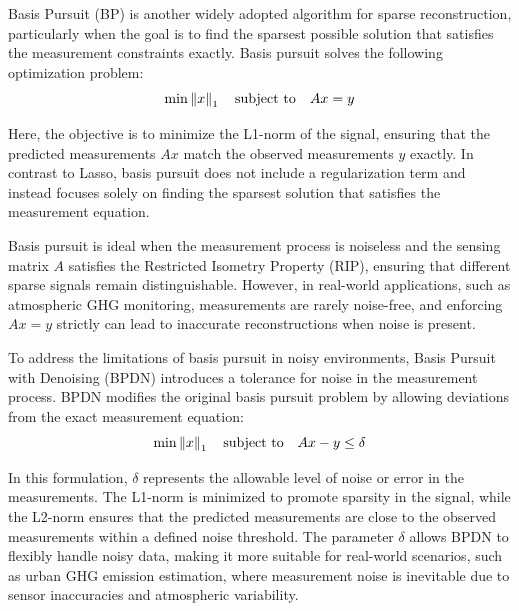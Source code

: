 
Basis Pursuit (BP) is another widely adopted algorithm for sparse reconstruction, particularly when the goal is to find the sparsest possible solution that satisfies the measurement constraints exactly.
Basis pursuit solves the following optimization problem:
\begin{equation}
    \min \left\lVert x\right\rVert_1 \quad \text{subject to} \quad  Ax = y
\end{equation}

Here, the objective is to minimize the L1-norm of the signal, ensuring that the predicted measurements $A x$ match the observed measurements $y$ exactly.
In contrast to Lasso, basis pursuit does not include a regularization term and instead focuses solely on finding the sparsest solution that satisfies the measurement equation.

Basis pursuit is ideal when the measurement process is noiseless and the sensing matrix $A$ satisfies the Restricted Isometry Property (RIP), ensuring that different sparse signals remain distinguishable.
However, in real-world applications, such as atmospheric GHG monitoring, measurements are rarely noise-free, and enforcing $Ax = y$ strictly can lead to inaccurate reconstructions when noise is present.

To address the limitations of basis pursuit in noisy environments, Basis Pursuit with Denoising (BPDN) introduces a tolerance for noise in the measurement process.
BPDN modifies the original basis pursuit problem by allowing deviations from the exact measurement equation:
\begin{equation}
    \min \left\lVert x\right\rVert_1 \quad \text{subject to} \quad  Ax -y \le \delta
\end{equation}

In this formulation, $\delta$ represents the allowable level of noise or error in the measurements.
The L1-norm is minimized to promote sparsity in the signal, while the L2-norm ensures that the predicted measurements are close to the observed measurements within a defined noise threshold.
The parameter $\delta$ allows BPDN to flexibly handle noisy data, making it more suitable for real-world scenarios, such as urban GHG emission estimation, where measurement noise is inevitable due to sensor inaccuracies and atmospheric variability.

